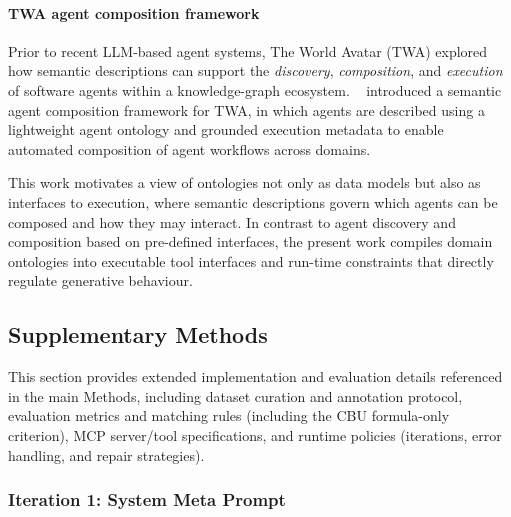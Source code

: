 \paragraph{TWA agent composition framework}
Prior to recent LLM-based agent systems, The World Avatar (TWA) explored how semantic descriptions can support the \emph{discovery}, \emph{composition}, and \emph{execution} of software agents within a knowledge-graph ecosystem. ~\citep{zhou2019agent} introduced a semantic agent composition framework for TWA, in which agents are described using a lightweight agent ontology and grounded execution metadata to enable automated composition of agent workflows across domains.

This work motivates a view of ontologies not only as data models but also as interfaces to execution, where semantic descriptions govern which agents can be composed and how they may interact. In contrast to agent discovery and composition based on pre-defined interfaces, the present work compiles domain ontologies into executable tool interfaces and run-time constraints that directly regulate generative behaviour.
\subsection{Supplementary Methods}\label{sec:supp-methods}
This section provides extended implementation and evaluation details referenced in the main Methods, including dataset curation and annotation protocol, evaluation metrics and matching rules (including the CBU formula-only criterion), MCP server/tool specifications, and runtime policies (iterations, error handling, and repair strategies).


\clearpage
\subsubsection{Iteration 1: System Meta Prompt}

